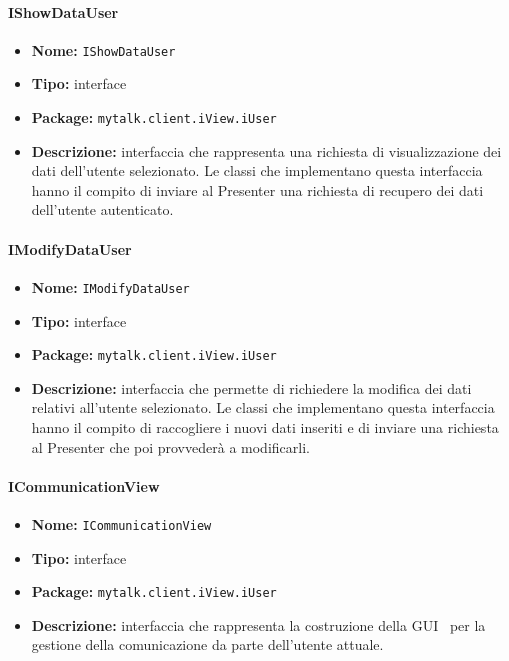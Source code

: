 {{\paragraph{IShowDataUser}{
	\begin{itemize}
		\item [] \textbf{Nome:} \texttt{IShowDataUser}
		\item [] \textbf{Tipo:} interface
		\item [] \textbf{Package:} \texttt{mytalk.client.iView.iUser}
		\item [] \textbf{Descrizione:}{ interfaccia che rappresenta una richiesta di visualizzazione dei dati dell'utente selezionato. Le classi che implementano questa interfaccia hanno il compito di inviare al Presenter una richiesta di recupero dei dati dell'utente autenticato.}
	\end{itemize}
}
\paragraph{IModifyDataUser}{
	\begin{itemize}
		\item [] \textbf{Nome:} \texttt{IModifyDataUser}
		\item [] \textbf{Tipo:} interface
		\item [] \textbf{Package:} \texttt{mytalk.client.iView.iUser}
		\item [] \textbf{Descrizione:}{ interfaccia che permette di richiedere la modifica dei dati relativi all'utente selezionato. Le classi che implementano questa interfaccia hanno il compito di raccogliere i nuovi dati inseriti e di inviare una richiesta al Presenter che poi provvederà a modificarli.}
	\end{itemize}
}
\paragraph{ICommunicationView}{
	\begin{itemize}
		\item [] \textbf{Nome:} \texttt{ICommunicationView}
		\item [] \textbf{Tipo:} interface
		\item [] \textbf{Package:} \texttt{mytalk.client.iView.iUser}
		\item [] \textbf{Descrizione:}{ interfaccia che rappresenta la costruzione della GUI\g~ per la gestione della comunicazione da parte dell'utente attuale.}
	\end{itemize}
}
}}
